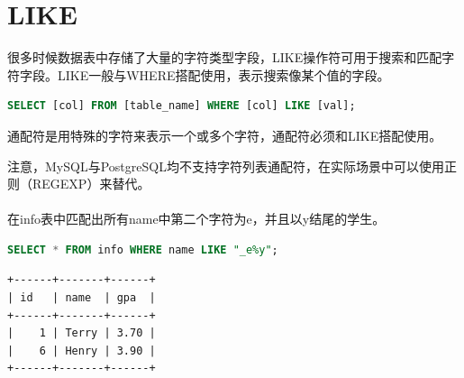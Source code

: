 \documentclass[12pt, openany, oneside]{book}
\begin{document}
\vspace{0.5cm}

\section{LIKE}

很多时候数据表中存储了大量的字符类型字段，LIKE操作符可用于搜索和匹配字符字段。LIKE一般与WHERE搭配使用，表示搜索像某个值的字段。

\vspace{-0.5cm}

\begin{lstlisting}[language=SQL]
SELECT [col] FROM [table_name] WHERE [col] LIKE [val];
\end{lstlisting}

通配符是用特殊的字符来表示一个或多个字符，通配符必须和LIKE搭配使用。

\begin{table}[H]
	\centering
	\caption{通配符}
\end{table}

注意，MySQL与PostgreSQL均不支持字符列表通配符，在实际场景中可以使用正则（REGEXP）来替代。\\

\\

在info表中匹配出所有name中第二个字符为e，并且以y结尾的学生。

\vspace{-0.5cm}

\begin{lstlisting}[language=SQL]
SELECT * FROM info WHERE name LIKE "_e%y";
\end{lstlisting}

\begin{tcolorbox}
	\begin{verbatim}
+------+-------+------+
| id   | name  | gpa  |
+------+-------+------+
|    1 | Terry | 3.70 |
|    6 | Henry | 3.90 |
+------+-------+------+
\end{verbatim}
\end{tcolorbox}
\end{document}
